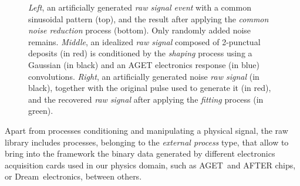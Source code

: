 \begin{figure}[htb!]
  \centering
	\caption{\emph{Left}, an artificially generated \emph{raw signal event} with a common sinusoidal pattern (top), and the result after applying the \emph{common noise reduction} process (bottom). Only randomly added noise remains. \emph{Middle}, an idealized \emph{raw signal} composed of 2-punctual deposits (in red) is conditioned by the \emph{shaping} process using a Gaussian (in black) and an AGET electronics response (in blue) convolutions. \emph{Right}, an artificially generated noise \emph{raw signal} (in black), together with the original pulse used to generate it (in red), and the recovered \emph{raw signal} after applying the \emph{fitting} process (in green).}\label{fig:rawlib}
\end{figure}

Apart from processes conditioning and manipulating a physical signal, the raw library includes processes, belonging to the \emph{external process} type, that allow to bring into the framework the binary data generated by different electronics acquisition cards used in our physics domain, such as AGET\,\cite{6154095} and AFTER chips, or Dream\,\cite{Dream} electronics, between others.

